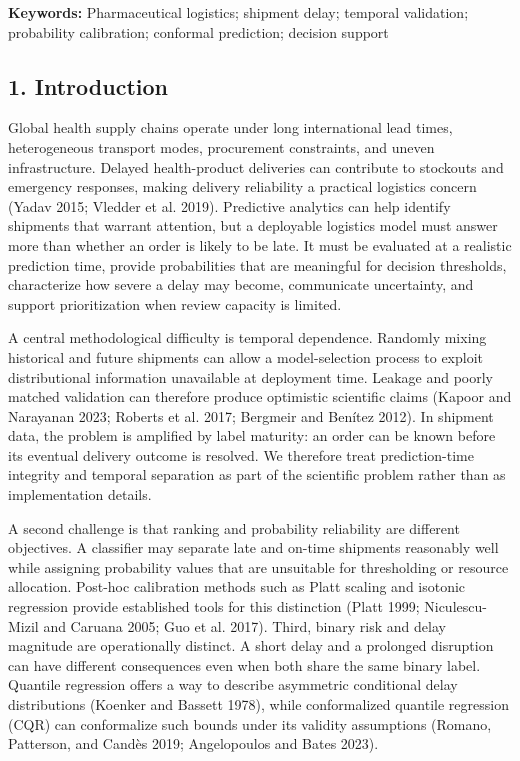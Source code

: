 \documentclass[
]{article}
\begin{document}
\textbf{Keywords:} Pharmaceutical logistics; shipment delay; temporal
validation; probability calibration; conformal prediction; decision
support

\subsection{1. Introduction}\label{introduction}

Global health supply chains operate under long international lead times,
heterogeneous transport modes, procurement constraints, and uneven
infrastructure. Delayed health-product deliveries can contribute to
stockouts and emergency responses, making delivery reliability a
practical logistics concern (Yadav 2015; Vledder et al. 2019).
Predictive analytics can help identify shipments that warrant attention,
but a deployable logistics model must answer more than whether an order
is likely to be late. It must be evaluated at a realistic prediction
time, provide probabilities that are meaningful for decision thresholds,
characterize how severe a delay may become, communicate uncertainty, and
support prioritization when review capacity is limited.

A central methodological difficulty is temporal dependence. Randomly
mixing historical and future shipments can allow a model-selection
process to exploit distributional information unavailable at deployment
time. Leakage and poorly matched validation can therefore produce
optimistic scientific claims (Kapoor and Narayanan 2023; Roberts et al.
2017; Bergmeir and Benítez 2012). In shipment data, the problem is
amplified by label maturity: an order can be known before its eventual
delivery outcome is resolved. We therefore treat prediction-time
integrity and temporal separation as part of the scientific problem
rather than as implementation details.

A second challenge is that ranking and probability reliability are
different objectives. A classifier may separate late and on-time
shipments reasonably well while assigning probability values that are
unsuitable for thresholding or resource allocation. Post-hoc calibration
methods such as Platt scaling and isotonic regression provide
established tools for this distinction (Platt 1999; Niculescu-Mizil and
Caruana 2005; Guo et al. 2017). Third, binary risk and delay magnitude
are operationally distinct. A short delay and a prolonged disruption can
have different consequences even when both share the same binary label.
Quantile regression offers a way to describe asymmetric conditional
delay distributions (Koenker and Bassett 1978), while conformalized
quantile regression (CQR) can conformalize such bounds under its
validity assumptions (Romano, Patterson, and Candès 2019; Angelopoulos
and Bates 2023).
\end{document}
